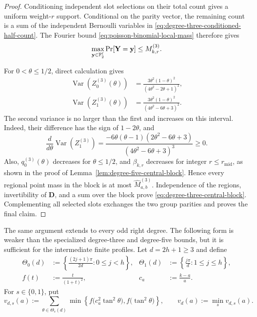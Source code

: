 \begin{proof}
Conditioning independent slot selections on their total count gives a uniform
weight-$r$ support.  Conditional on the parity vector, the remaining count is
a sum of the independent Bernoulli variables in
\eqref{eq:degree-three-conditioned-half-count}.  The Fourier bound
\eqref{eq:poisson-binomial-local-mass} therefore gives
\begin{equation*}
 \max_{\mathbf y\in\mathbb F_2^\ell}\Pr[\mathbf Y=\mathbf y]
 \leq M^{(3)}_{k,r}.
\end{equation*}

For $0<\theta\leq1/2$, direct calculation gives
\begin{align*}
 \operatorname{Var}(Z^{(3)}_0(\theta))
 &=\frac{3\theta^2(1-\theta)^2}{(4\theta^2-2\theta+1)^2},\\
 \operatorname{Var}(Z^{(3)}_1(\theta))
 &=\frac{3\theta^2(1-\theta)^2}{(4\theta^2-6\theta+3)^2}.
\end{align*}
The second variance is no larger than the first and increases on this
interval.  Indeed, their difference has the sign of $1-2\theta$, and
\begin{equation*}
 \frac{d}{d\theta}\operatorname{Var}(Z^{(3)}_1)
 =\frac{-6\theta(\theta-1)(2\theta^2-6\theta+3)}
 {(4\theta^2-6\theta+3)^3}\geq0.
\end{equation*}
Also, $q^{(3)}_0(\theta)$ decreases for $\theta\leq1/2$, and
$\beta_{k,r}$ decreases for integer $r\leq r_{\mathrm{mid}}$, as shown in
the proof of Lemma~\ref{lem:degree-five-central-block}.  Hence every regional point mass
in the block is at most $\widehat M^{(3)}_{a,b}$.  Independence of the
regions, invertibility of $\mathbf D$, and a sum over the block prove
\eqref{eq:degree-three-central-block}.  Complementing all selected slots
exchanges the two group parities and proves the final claim.
\end{proof}

The same argument extends to every odd right degree.  The following form is
weaker than the specialized degree-three and degree-five bounds, but it is
sufficient for the intermediate finite profiles.  Let $d=2h+1\geq3$ and define
\begin{align*}
 \Theta_0(d)&:=\left\{\frac{(2j+1)\pi}{2d}:0\leq j<h\right\},&
 \Theta_1(d)&:=\left\{\frac{j\pi}{d}:1\leq j\leq h\right\},\\
 f(t)&:=\frac{t}{(1+t)^2},&c_a&:=\frac{k-a}{a}.
\end{align*}
For $s\in\{0,1\}$, put
\begin{equation}
 v_{d,s}(a):=
 \sum_{\theta\in\Theta_s(d)}
 \min\left\{f\bigl(c_a^2\tan^2\theta\bigr),
                   f\bigl(\tan^2\theta\bigr)\right\},
 \qquad
 v_d(a):=\min_s v_{d,s}(a).
 \label{eq:odd-degree-uniform-variance}
\end{equation}

